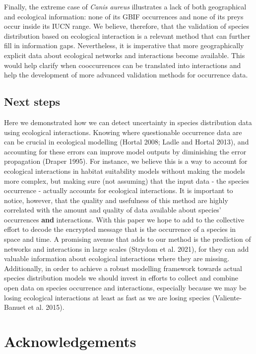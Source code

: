 \documentclass[10pt,oneside]{article}
\begin{document}
Finally, the extreme case of \emph{Canis aureus} illustrates a lack of
both geographical and ecological information: none of its GBIF
occurrences and none of its preys occur inside its IUCN range. We
believe, therefore, that the validation of species distribution based on
ecological interaction is a relevant method that can further fill in
information gaps. Nevertheless, it is imperative that more
geographically explicit data about ecological networks and interactions
become available. This would help clarify when cooccurrences can be
translated into interactions and help the development of more advanced
validation methods for occurrence data.

\hypertarget{next-steps}{%
\subsection{Next steps}\label{next-steps}}

Here we demonstrated how we can detect uncertainty in species
distribution data using ecological interactions. Knowing where
questionable occurrence data are can be crucial in ecological modelling
(Hortal 2008; Ladle and Hortal 2013), and accounting for these errors
can improve model outputs by diminishing the error propagation (Draper
1995). For instance, we believe this is a way to account for ecological
interactions in habitat suitability models without making the models
more complex, but making sure (not assuming) that the input data - the
species occurrence - actually accounts for ecological interactions. It
is important to notice, however, that the quality and usefulness of this
method are highly correlated with the amount and quality of data
available about species' occurrences \textbf{and} interactions. With
this paper we hope to add to the collective effort to decode the
encrypted message that is the occurrence of a species in space and time.
A promising avenue that adds to our method is the prediction of networks
and interactions in large scales (Strydom et al. 2021), for they can add
valuable information about ecological interactions where they are
missing. Additionally, in order to achieve a robust modelling framework
towards actual species distribution models we should invest in efforts
to collect and combine open data on species occurrence and interactions,
especially because we may be losing ecological interactions at least as
fast as we are losing species (Valiente-Banuet et al. 2015).

\hypertarget{acknowledgements}{%
\section{Acknowledgements}\label{acknowledgements}}
\end{document}
